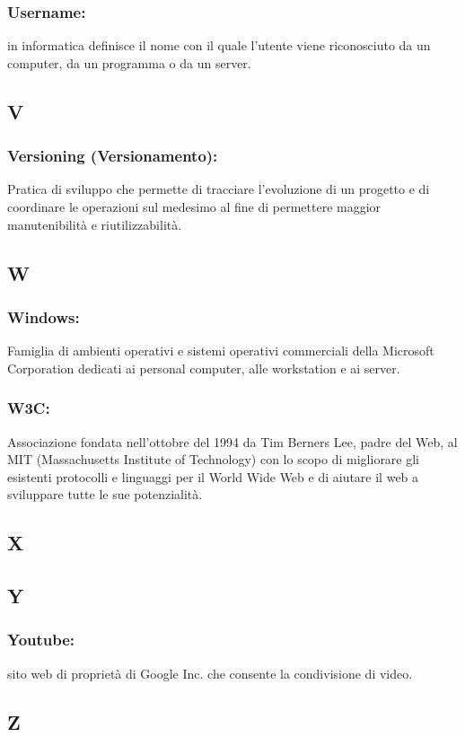 \subsubsection*{Username:} in informatica definisce il nome con il quale
l'utente viene riconosciuto da un computer, da un programma o da un server.

\subsection*{\huge{V}} 
\subsubsection*{Versioning (Versionamento):} Pratica di sviluppo che permette di
tracciare l'evoluzione di un progetto e di coordinare le operazioni sul medesimo
al fine di permettere maggior manutenibilit\`a e riutilizzabilit\`a.

\subsection*{\huge{W}}
\subsubsection*{Windows:} Famiglia di ambienti operativi e sistemi operativi
commerciali della Microsoft Corporation dedicati ai personal computer, alle workstation e ai server.

\subsubsection*{W3C:} Associazione fondata nell'ottobre del 1994 da Tim Berners
Lee, padre del Web, al MIT (Massachusetts Institute of Technology) con lo scopo di migliorare
gli esistenti protocolli e linguaggi per il World Wide Web e di aiutare il web a
sviluppare tutte le sue potenzialit\`a.

\subsection*{\huge{X}}
\subsection*{\huge{Y}}
\subsubsection*{Youtube:} sito web di propriet\`a di Google Inc. che consente la
condivisione di video.
\subsection*{\huge{Z}}






